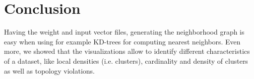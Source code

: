 \documentclass[12pt]{article}
\begin{document}
\section{Conclusion}
Having the weight and input vector files, generating the neighborhood graph is easy when using for example KD-trees for computing nearest neighbors. Even more, we showed that the visualizations allow to identify different characteristics of a dataset, like local densities (i.e. clusters), cardinality and density of clusters as well as topology violations.
\end{document}
